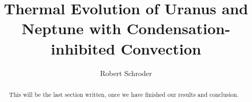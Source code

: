 \documentclass[11pt]{ucscthesisbs}
\begin{document}

\title{Thermal Evolution of Uranus and Neptune with Condensation-inhibited Convection}
\author{Robert Schroder}
%

%





\maketitle
\copyrightpage

\begin{frontmatter}

\begin{abstract}
This will be the last section written, once we have finished our results and conclusion.
\end{abstract}

\tableofcontents
%
%
\listoffigures
\listoftables


\end{frontmatter}

\end{document}
